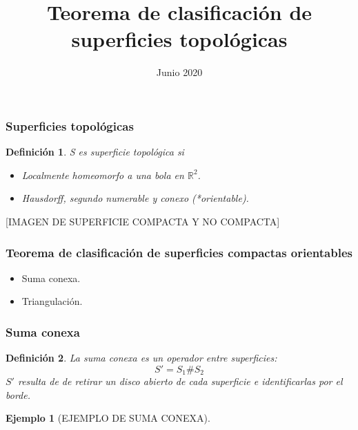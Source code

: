 \documentclass{beamer}
\title[Teorema de clasificación de superficies]{Teorema de clasificación de superficies topológicas}
\author[Rodrigo De Pool]{}
\date[]{Junio 2020}
\newtheorem*{defi}{Definición}
\newtheorem*{ejem}{Ejemplo}
{
\beamertemplatesolidbackgroundcolor{black!5}
}
\begin{document}
\frame{\titlepage}
 
\begin{frame}
\frametitle{Superficies topológicas}

\begin{defi}
S es superficie topológica si
\begin{itemize}
    \item Localmente homeomorfo a una bola en $\mathbb{R}^2$.
    \item Hausdorff, segundo numerable y conexo (*orientable).
\end{itemize}
\end{defi}
[IMAGEN DE SUPERFICIE COMPACTA Y NO COMPACTA]
\end{frame}

\begin{frame}
\frametitle{Teorema de clasificación de superficies compactas orientables}

\begin{itemize}
\item Suma conexa.
\item Triangulación.
\end{itemize}
\end{frame}

\begin{frame}
\frametitle{Suma conexa}

\begin{defi}
La suma conexa es un operador entre superficies:
\[S' = S_1 \# S_2 \]
$S'$ resulta de de retirar un disco abierto de cada superficie e identificarlas por el borde.
\end{defi}
\begin{ejem}
[EJEMPLO DE SUMA CONEXA]
\end{ejem}

\end{frame}
\end{document}
